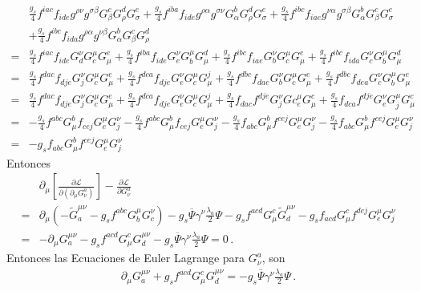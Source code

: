 \begin{align}
  &\frac{g_s}{4}f^{iac}f_{ide}g^{\rho\nu}g^{\sigma\beta}G^c_\beta G^d_\rho G^e_\sigma
+\frac{g_s}{4}f^{iba}f_{ide}g^{\rho\alpha}g^{\sigma\nu}G^b_{\alpha}G^d_\rho G^e_\sigma
+\frac{g_s}{4}f^{ibc}f_{iae}g^{\nu\alpha}g^{\sigma\beta}G^b_{\alpha}G^c_\beta G^e_\sigma\nonumber\\
&+\frac{g_s}{4}f^{ibc}f_{ida}g^{\rho\alpha}g^{\nu\beta}G^b_{\alpha}G^c_\beta G^d_\rho\nonumber\\
=&\frac{g_s}{4}f^{iac}f_{ide}G_d^\nu G_c^\mu G^e_\mu
+\frac{g_s}{4}f^{iba}f_{ide}G_e^\nu G_b^{\mu}G^d_\mu
+\frac{g_s}{4}f^{ibc}f_{iae}G_b^{\nu}G_c^\mu G^e_\mu
+\frac{g_s}{4}f^{ibc}f_{ida}G_c^\nu G_b^{\mu}G^d_\mu\nonumber\\
=&  \frac{g_s}{4}f^{dac}f_{dje}G_j^\nu G_c^\mu G^e_\mu
+\frac{g_s}{4}f^{dca}f_{dje}G_e^\nu G_c^{\mu}G^j_\mu
+\frac{g_s}{4}f^{dbc}f_{dae}G_b^{\nu}G_c^\mu G^e_\mu
+\frac{g_s}{4}f^{dbc}f_{dea}G_c^\nu G_b^{\mu}G^e_\mu\nonumber\\
=&  \frac{g_s}{4}f^{dac}f_{dje}G_j^\nu G_c^\mu G^e_\mu
+\frac{g_s}{4}f^{dca}f_{dje}G_e^\nu G_c^{\mu}G^j_\mu
+\frac{g_s}{4}f_{dac}f^{dje}G_j^{\nu}Gc_e^\mu G^c_\mu
+\frac{g_s}{4}f_{dca}f^{dje}G_e^\nu G_j^{\mu}G^c_\mu\nonumber\\
=&  -\frac{g_s}{4}f^{abc}G^b_\mu f_{cej}G_e^\mu G_j^\nu
-\frac{g_s}{4}f^{abc}G^b_{\mu}f_{cej}G_e^\mu G_j^\nu
-\frac{g_s}{4}f_{abc}G^b_\mu f^{cej}G_e^\mu G_j^{\nu}
-\frac{g_s}{4}f_{abc}G^b_\mu f^{cej}G_e^{\mu}G_j^\nu\nonumber\\
=&-g_sf_{abc}G^b_\mu f^{cej}G_e^{\mu}G_j^\nu
\end{align}
Entonces
\begin{align}
    &\partial_\mu\left[\frac{\partial\mathcal{L}}{\partial\left(\partial_\mu G_\nu^a\right)}\right]-\frac{\partial\mathcal{L}}{\partial G_\nu^a}\nonumber\\
    =&\partial_\mu\left(-  \widetilde{G}^{\mu\nu}_a-g_s f^{abc}G_b^\mu G^\nu_c
\right)
-g_s\overline{\Psi}\gamma^\nu\frac{\lambda_a}{2}\Psi
-g_s f^{acd}G^c_\mu\widetilde{G}^{\mu\nu}_d
-g_sf_{acd}G^c_\mu f^{dej}G_e^{\mu}G_j^\nu\nonumber\\
      =&-\partial_\mu{G}^{\mu\nu}_a-g_s f^{acd}G^c_\mu{G}^{\mu\nu}_d
-g_s\overline{\Psi}\gamma^\nu\frac{\lambda_a}{2}\Psi=0\,.
\end{align}
Entonces las Ecuaciones de Euler Lagrange para $G_\nu^a$, son
\begin{align}
\label{eq:Gmuael}
\partial_\mu{G}^{\mu\nu}_a+g_s f^{acd}G^c_\mu{G}^{\mu\nu}_d
=-g_s\overline{\Psi}\gamma^\nu\frac{\lambda_a}{2}\Psi\,.
\end{align}

